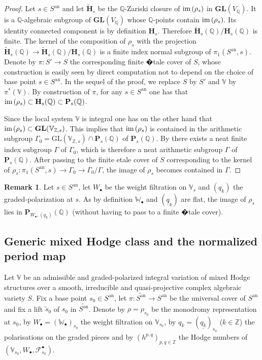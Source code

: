 \documentclass[10pt]{article}
\numberwithin{equation}{subsection}
\theoremstyle{plain}
\theoremstyle{definition}
\newtheorem{remark}[theorem]{Remark}
\theoremstyle{remark}
\newcommand{\Z}{\mathbb Z}
\newcommand{\Q}{\mathbb Q}
\newcommand{\V}{\mathbb V}
\newcommand{\W}{\mathbb W}
\newcommand{\pp}{\mathbf P}
\newcommand{\mon}{\mathbf H}
\newcommand{\bul}{\bullet}
\newcommand{\im}{\mathrm{im} \hspace{0.05cm}}
\newcommand{\an}{\mathrm{an}}
\newcommand{\gl}{\mathbf{GL}}
\newcommand{\GL}{\mathrm{GL}}
\newcommand{\ppol}{\pp_{W_\bul, (q_k)}}
\begin{document}
\begin{proof}
Let $s \in S^\an$ and let $\tilde{\mon}_s$ be the $\Q$-Zariski closure of $\im(\rho_s)$ in $\gl(V_\Q)$. It is a $\Q$-algebraic subgroup of $\gl(V_\Q)$ whose $\Q$-points contain $\im(\rho_s)$. Its identity connected component is by definition $\mon_s$. Therefore $\tilde{\mon}_s(\Q)/\mon_s(\Q)$ is finite. The kernel of the composition of $\rho_s$ with the projection $\tilde{\mon}_s(\Q) \rightarrow \tilde{\mon}_s(\Q)/\mon_s(\Q)$ is a finite index normal subgroup of $\pi_1(S^\an,s)$. Denote by $\pi : S' \rightarrow S$ the corresponding finite �tale cover of $S$, whose construction is easily seen by direct computation not to depend on the choice of base point $s \in S^\an$. In the sequel of the proof, we replace $S$ by $S'$ and $\V$ by $\pi^\ast(\V)$. By construction of $\pi$, for any $s \in S^\an$ one has that $\im(\rho_s) \subset \mon_s(\Q) \subset \pp_s(\Q)$.

Since the local system $\V$ is integral one has on the other hand that $\im(\rho_s) \subset \gl(\V_{\Z,s})$. This implies that $\im(\rho_s)$ is contained in the arithmetic subgroup $\Gamma_0 = \GL(\V_{\Z,s}) \cap \pp_s(\Q)$ of $\pp_s(\Q)$. By \cite[Prop. 17.4]{borel} there exists a neat finite index subgroup $\Gamma$ of $\Gamma_0$, which is therefore a neat arithmetic subgroup $\Gamma$ of $\pp_s(\Q)$. After passing to the finite etale cover of $S$ corresponding to the kernel of $\rho_s : \pi_1(S^\an,s) \rightarrow \Gamma_0 \rightarrow \Gamma_0/\Gamma$, the image of $\rho_s$ becomes contained in $\Gamma$.
\end{proof}
\begin{remark}
Let  $s \in S^\an$, let $W_\bul$ be the weight filtration on $\V_s$ and $(q_k)$ the graded-polarization at $s$. As by definition $\W_\bul$ and $(\underline{q}_k)$ are flat, the image of $\rho_s$ lies in $\ppol(\Q)$ (without having to pass to a finite �tale cover).
\end{remark}
\subsection{Generic mixed Hodge class and the normalized period map}
Let $\V$ be an admissible and graded-polarized integral variation of mixed Hodge structures over a smooth, irreducible and quasi-projective complex algebraic variety $S$. Fix a base point $s_0 \in S^\an$,  let $\pi : \widetilde{S^\an} \rightarrow S^\an$ be the universal cover of $S^\an$ and fix a lift $\tilde{s}_0$ of $s_0$ in $\widetilde{S^\an}$. Denote by $\rho = \rho_{s_0}$ be the monodromy representation at $s_0$, by $W_\bul = (\W_\bul)_{s_0}$ the weight filtration on $\V_{s_0}$, by $q_k = (\underline{q_k})_{s_0}$ ($k \in \Z$) the polarisations on the graded pieces and by $(h^{p,q})_{p,q \in \Z}$ the Hodge numbers of $(\V_{s_0},W_\bul, \mathcal{F}^\bul_{s_0})$.
\end{document}
